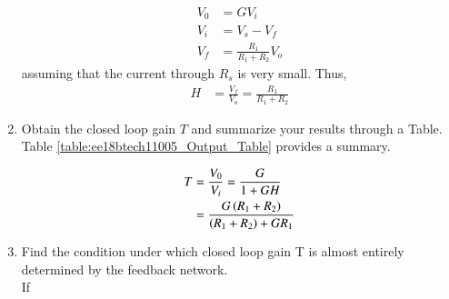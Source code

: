 \begin{enumerate}[label=\thesection.\arabic*.,ref=\thesection.\theenumi]
\begin{align}
\label{eq:ee18btech11005_opamp_output}
V_0 &= GV_i
\\
 V_i &= V_s -V_f
\\
V_f &= \frac{R_1}{R_1+R_2}V_o
\end{align}
%
assuming that the current through $R_s$ is very small.  Thus, 
\begin{align}
H &=  \frac{V_f}{V_o} = \frac{R_1}{R_1+R_2}
\label{eq:ee18btech11005_H}
\end{align}
\item  Obtain the closed loop gain $T$ and summarize your results through a Table.
\\
\solution Table \ref{table:ee18btech11005_Output_Table} provides a summary.

\begin{align}
\label{eq:ee18btech11005_T}
T &=    \frac{V_0}{V_i}= \frac{G}{1+GH}
  \\
&= \frac{G\left(R_1+R_2\right)}{\left(R_1+R_2\right)+GR_1}
\end{align}
\begin{table}[!ht]
\centering

\caption{}
\label{table:ee18btech11005_Output_Table}
\end{table}
%
\item Find the condition under which closed loop gain T is almost entirely determined by the feedback network.
\\
\solution If 


\end{enumerate}
